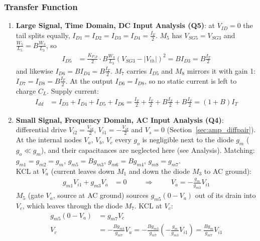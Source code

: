 \subsubsection{Transfer Function}
\begin{enumerate}
  \item \textbf{Large Signal, Time Domain, DC Input Analysis (Q5)}:
    at \(V_{ID} = 0\) the tail splits equally, \(I_{D1} = I_{D2} = I_{D3} = I_{D4} = \frac{I_T}{2}\).
    \(M_5\) has \(V_{SG5} = V_{SG3}\) and \(\frac{W_5}{L_5} = B\frac{W_3}{L_3}\), so
    \begin{align*}
      I_{D5} &= \frac{K_{P,p}}{2}\cdot B\frac{W_3}{L_3}(V_{SG3} - |V_{th}|)^2 = B I_{D3} = B\frac{I_T}{2}
    \end{align*}
    and likewise \(I_{D6} = B I_{D4} = B\frac{I_T}{2}\). \(M_7\) carries \(I_{D5}\) and
    \(M_8\) mirrors it with gain 1: \(I_{D7} = I_{D8} = B\frac{I_T}{2}\). At the
    output \(I_{D6} = I_{D8}\), so no static current is left to charge \(C_L\).
    Supply current:
    \begin{align*}
      I_{dd} &= I_{D3} + I_{D4} + I_{D5} + I_{D6} = \frac{I_T}{2} + \frac{I_T}{2} + B\frac{I_T}{2} + B\frac{I_T}{2} = (1 + B) I_T
    \end{align*}
  \item \textbf{Small Signal, Frequency Domain, AC Input Analysis (Q4)}:
    differential drive \(V_{i2} = \frac{V_{id}}{2}\), \(V_{i1} = -\frac{V_{id}}{2}\) and
    \(V_s = 0\) (Section~\ref{sec:amp_diffpair}). At the internal nodes
    \(V_a\), \(V_b\), \(V_c\) every \(g_o\) is negligible next to the diode \(g_m\)
    (\(g_o \ll g_m\)), and their capacitances are neglected here (see
    Analysis). Matching: \(g_{m1} = g_{m2} = g_m\), \(g_{m5} = B g_{m3}\),
    \(g_{m6} = B g_{m4}\), \(g_{m8} = g_{m7}\).\\
    KCL at \(V_a\) (current leaves down \(M_1\) and down the diode \(M_3\) to AC ground):
    \begin{align*}
      g_{m1} V_{i1} + g_{m3} V_a &= 0 \hspace{1cm} \Rightarrow \hspace{1cm} V_a = -\frac{g_m}{g_{m3}} V_{i1} \tag{1}
    \end{align*}
    \(M_5\) (gate \(V_a\), source at AC ground) sources \(g_{m5}(0 - V_a)\) out of its
    drain into \(V_c\), which leaves through the diode \(M_7\). KCL at \(V_c\):
    \begin{align*}
      g_{m5}(0 - V_a) &= g_{m7} V_c \\
      V_c &= -\frac{B g_{m3}}{g_{m7}} V_a = -\frac{B g_{m3}}{g_{m7}}\left(-\frac{g_m}{g_{m3}} V_{i1}\right) = \frac{B g_m}{g_{m7}} V_{i1} \tag{2}

\end{align*}
\end{enumerate}
